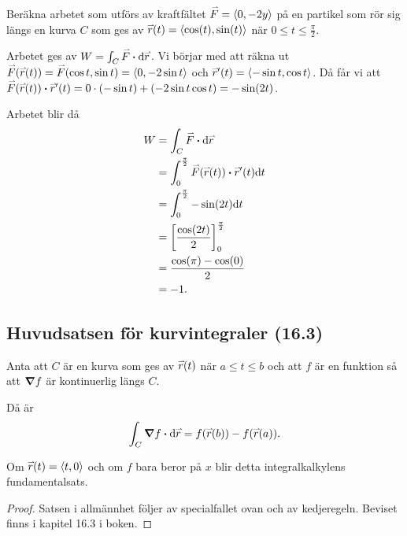 \documentclass[a4paper]{article}
\begin{document}
\begin{ex}
    Beräkna arbetet som utförs av kraftfältet \(
        \accentset{\rightharpoonup}{F} = \left\langle 0, -2y \right\rangle
    \) på en partikel som rör sig längs en kurva \(
        C 
    \) som ges av \(
        \accentset{\rightharpoonup}{r}(t) = \left\langle \cos(t), \sin(t)\right\rangle
    \) när \(
        0 \leq t \leq \frac{\pi}{2} 
    \).

    Arbetet ges av \(
        W = \int_C \accentset{\rightharpoonup}{F} \boldsymbol{\cdot} \dd \accentset{\rightharpoonup}{r}
    \). Vi börjar med att räkna ut \(
        \accentset{\rightharpoonup}{F}(\accentset{\rightharpoonup}{r}(t)) = \accentset{\rightharpoonup}{F}(\cos t, \sin t) = \left\langle 0, -2\sin t\right\rangle 
    \) och \(
        \accentset{\rightharpoonup}{r}'(t) = \left\langle - \sin t, \cos t\right\rangle
    \). Då får vi att \(
        \accentset{\rightharpoonup}{F}(\accentset{\rightharpoonup}{r}(t)) \boldsymbol{\cdot} \accentset{\rightharpoonup}{r}'(t) = 0 \cdot (-\sin t) + (-2 \sin t \cos t)
            = -\sin(2t)
    \).

    Arbetet blir då 
    \begin{align*}
        W &= \int_C \accentset{\rightharpoonup}{F} \boldsymbol{\cdot} \dd \accentset{\rightharpoonup}{r} \\
          &= \int_0^{\frac{\pi}{2}} \accentset{\rightharpoonup}{F}(\accentset{\rightharpoonup}{r}(t)) \boldsymbol{\cdot} \accentset{\rightharpoonup}{r}'(t) \dd t \\
          &= \int_0^{\frac{\pi}{2}} -\sin(2t) \dd t \\
          &= \qty[ \frac{\cos(2t)}{2}]_0^{\frac{\pi}{2}} \\
          &= \frac{\cos(\pi) - \cos(0)}{2} \\
          &= -1. 
    \end{align*}
\end{ex}

\subsection{Huvudsatsen för kurvintegraler (16.3)}
\begin{sats}
    Anta att \(
        C
    \) är en kurva som ges av \(
        \accentset{\rightharpoonup}{r}(t)
    \) när \(
        a \leq t \leq b
    \) och att \(
        f
    \) är en funktion så att \(
        \grad f 
    \) är kontinuerlig längs \(
        C
    \). 
    
    Då är \[
        \int_C \grad f \boldsymbol{\cdot} \dd \accentset{\rightharpoonup}{r} = f(\accentset{\rightharpoonup}{r}(b)) - f(\accentset{\rightharpoonup}{r}(a)).
    \] 

    Om \(
        \accentset{\rightharpoonup}{r}(t) = \left\langle t, 0\right\rangle
    \) och om \(
        f
    \) bara beror på \(
        x
    \) blir detta integralkalkylens fundamentalsats.

    \begin{proof}
        Satsen i allmännhet följer av specialfallet ovan och av kedjeregeln. 
        Beviset finns i kapitel 16.3 i boken.
    \end{proof}
\end{sats}
\end{document}
